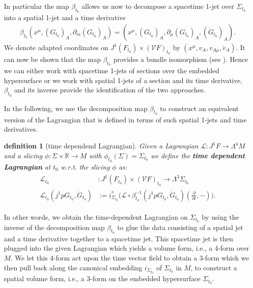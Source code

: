 \documentclass[a4paper,12pt, DIV=14, BCOR=5mm, twoside, headsepline, numbers=noenddot]{scrbook}
\newtheorem{definition}{definition}[section]
\begin{document}
In particular the map $\beta_{t_0}$ allows us now to decompose a spacetime 1-jet over $\Sigma_{t_0}$ into a spatial 1-jet and a time derivative
\begin{align}
    \beta_{t_0}(x^{\mu},(G_{t_0})_A, \partial_m(G_{t_0})_A) = (x^{\mu},(G_{t_0})_A, \partial_{\mu}(G_{t_0})_A, (\dot{G}_{t_0})_A).
\end{align}
We denote adapted coordinates on $J^1(F_{t_0}) \times (\mathcal{V}F)_{t_0}$ by $(x^{\mu}, v_A, v_{A{\mu}}, \dot{v}_A)$. It can now be shown that the map $\beta_{t_0}$ provides a bundle isomorphism (see \cite{2004math.ph..11032G}). Hence we can either work with spacetime 1-jets of sections over the embedded hypersurface or we work with spatial 1-jets of a section and its time derivative, $\beta_{t_0}$ and its inverse provide the identification of the two approaches.

In the following, we use the decomposition map $\beta_{t_0}$ to construct an equivalent version of the Lagrangian that is defined in terms of such spatial 1-jets and time derivatives. 
\begin{definition}[time dependend Lagrangian]
Given a Lagrangian $\mathcal{L} : J^1F \rightarrow \Lambda^4M$ and a slicing $\phi : \Sigma \times \mathbb{R} \rightarrow M$ with $\phi_{t_0}(\Sigma) = \Sigma_{t_0}$ we define the \textbf{\textit{time dependent Lagrangian}} at $t_0$ w.r.t. the slicing $\phi$ as:
\begin{align}
\begin{aligned}
    \mathcal{L}_{t_0} &: J^1(F_{t_0}) \times (\mathcal{V}F)_{t_0} \longrightarrow \Lambda^3\Sigma_{t_0}\\
    \mathcal{L}_{t_0}(j^1pG_{t_0}, \dot{G}_{t_0}) &:= i_{\Sigma_{t_0}}^{\ast} \bigl( \mathcal{L}\circ \beta_{t_0}^{-1}(j^1pG_{t_0}, \dot{G}_{t_0})(\frac{\partial}{\partial t},-)\bigr). 
\end{aligned}
\end{align}
\end{definition}

In other words, we obtain the time-dependent Lagrangian on $\Sigma_{t_0}$ by using the inverse of the decomposition map $\beta_{t_0}$ to glue the data consisting of a spatial jet and a time derivative together to a spacetime jet. This spacetime jet is then plugged into the given Lagrangian which yields a volume form, i.e., a 4-form over $M$. We let this 4-form act upon the time vector field to obtain a 3-form which we then pull back along the canonical embedding $i_{\Sigma_{t_0}}$ of $\Sigma_{t_0}$ in $M$, to construct a spatial volume form, i.e., a 3-form on the embedded hypersurface $\Sigma_{t_0}$. 
\end{document}
